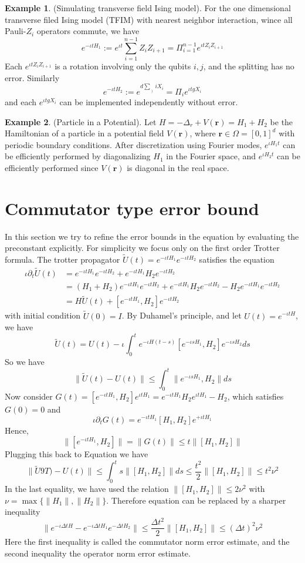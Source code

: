 \documentclass[12pt, oneside]{book}
\theoremstyle{definition}
\theoremstyle{definition}
\newtheorem{example}{Example}[section]
\theoremstyle{remark}
\begin{document}
\begin{example}
    (Simulating transverse field Ising model). For the one dimensional transverse filed Ising model (TFIM) with nearest neighbor interaction, wince all Pauli-$Z_i$ operators commute, we have
    \[
    e^{-\iota tH_1}:=e^{\iota t}\sum_{i=1}^{n-1} Z_iZ_{i+1} = \Pi_{i=1}^{n-1} e^{\iota t Z_i Z_{i+1}}
    \]
    Each $e^{\iota t Z_i Z_{i+1}}$ is a rotation involving only the qubits $i,j$, and the splitting has no error. Similarly
    \[
    e^{-\iota t H_2}:=e^{d\sum_)iX_i}= \Pi_i e^{\iota t g X_i}
    \]
    and each $e^{\iota t g X_i}$ can be implemented independently without error.
\end{example}
\begin{example}
    (Particle in a Potential). Let $H=-\Delta_r + V(\mathbf{r})=H_1+H_2$ be the Hamiltonian of a particle in a potential field $V(\mathbf{r})$, where $\mathbf{r} \in \Omega = [0,1]^d$ with periodic boundary conditions. After discretization using Fourier modes, $e^{\iota H_1 t}$ can be efficiently performed by diagonalizing $H_1$ in the Fourier space, and $e^{\iota H_2t}$ can be efficiently performed since $V(\mathbf{r})$ is diagonal in the real space.
\end{example}

\section{Commutator type error bound}
In this section we try to refine the error bounds in the equation by evaluating the preconstant explicitly. For simplicity we focus only on the first order Trotter formula. The trotter propagator $\tilde{U}(t)=e^{-\iota tH_1}e^{-\iota tH_2}$ satisfies the equation
\begin{align*}
\iota \partial_t\tilde{U}(t)&=e^{-\iota tH_1}e^{-\iota tH_2}+e^{-\iota tH_1}H_2e^{-\iota tH_2}\\
&=(H_1+H_2)e^{-\iota tH_1}e^{-\iota tH_2}+e^{-\iota t H_1}H_2e^{-\iota tH_2}-H_2e^{-\iota t H_1}e^{-\iota t H_2}\\
&=H\tilde{U}(t)+[e^{-\iota t H_1},H_2]e^{-\iota t H_2}
\end{align*}
with initial condition $\tilde{U}(0)=I$. By Duhamel's principle, and let $U(t)=e^{-\iota tH}$, we have
\[
\tilde{U}(t)=U(t)-\iota \int_0^t e^{-\iota H(t-s)}[e^{-\iota sH_1},H_2]e^{-\iota sH_2} ds
\]
So we have
\[
\|\tilde{U}(t)-U(t)\|\leq \int_0^t \|e^{-\iota s H_1},H_2\|ds
\]
Now consider $G(t)=[e^{-\iota t H_1},H_2]e^{\iota t H_1}=e^{-\iota tH_1}H_2e^{\iota t H_1}-H_2$, which satisfies $G(0)=0$ and
\[
\iota \partial_tG(t)=e^{-\iota t H_1} [H_1,H_2]e^{+\iota t H_1}
\]
Hence,
\[
\|[e^{-\iota t H_1},H_2]\|=\|G(t)\|\leq t\|[H_1,H_2]\|
\]
Plugging this back to Equation we have
\[
\|\tilde{U}9T)-U(t)\|\leq \int_0^t s\|[H_1,H_2]\|ds \leq \frac{t^2}{2}\|[H_1,H_2]\|\leq t^2\nu^2
\]
In the last equality, we have used the relation $\|[H_1,H_2]\| \leq 2\nu^2$ with $\nu = \max\{\|H_1\|,\|H_2\|\}$. Therefore equation can be replaced by a sharper inequality
\[
\|e^{-\iota \Delta tH}-e^{-\iota \Delta t H_1}e^{-\Delta tH_2}\|\leq \frac{\Delta t^2}{2} \|[H_1,H_2]\|\leq (\Delta t)^2\nu^2
\]
Here the first inequality is called the commutator norm error estimate, and the second inequality the operator norm error estimate.
\end{document}

